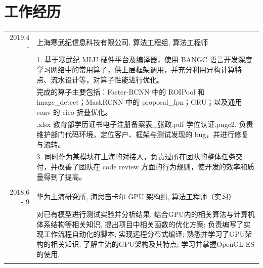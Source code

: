 \documentclass[a4paper,11pt]{article}
\begin{document}
\section{工作经历}
\begin{tabular}{r|p{11cm}}
 \textsc{2019.4 - } & 上海寒武纪信息科技有限公司, 算法工程组, 算法工程师 \\&\footnotesize{1. 基于寒武纪 MLU 硬件平台及编译器，使用 BANGC 语言开发深度学习网络中的常用算子，供上层框架调用，并充分利用异构计算特点、流水设计等，对算子性能进行优化。}\\&\footnotesize{完成的算子主要包括：Faster-RCNN 中的 ROIPool 和 image\_detect；MaskRCNN 中的 proposal\_fpn；GRU；以及通用 conv 的 cico 折叠优化。}\\&.xlsx
 教育部学历证书电子注册备案表_张政.pdf
 学位认证.pnge{2. 负责维护部门代码环境，定位客户、框架与测试发现的 bug，并进行修复与流转。}\\&\footnotesize{3. 同时作为某模块在上海的对接人，负责过所在团队的整体任务交付，并改善了团队在 code review 方面的行为规则，使开发的效率和质量得到了提高。}\\\multicolumn{2}{c}{} \\
 \textsc{2018.6 - 9} & 华为上海研究所, 海思笛卡尔 GPU 架构组, 算法工程师（实习） \\&\footnotesize{对已有模型进行测试实验并分析结果, 结合GPU内的相关算法与计算机体系结构等相关知识, 提出项目中相关函数的优化方案; 负责编写了实现工作流程自动化的脚本; 实现远程分布式编译; 熟悉并学习了GPU架构的相关知识, 了解主流的GPU架构及其特点; 学习并掌握OpenGL ES的使用.}\\\multicolumn{2}{c}{} \\
\end{tabular}

\end{document}
